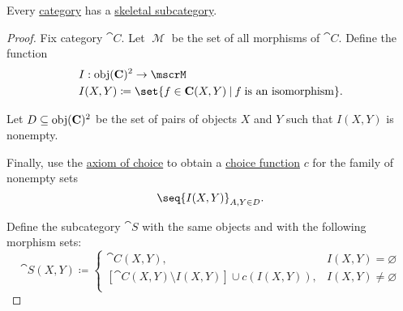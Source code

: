\begin{theorem}\label{thm:skeletal_subcategory_existence}
  Every \hyperref[def:category]{category} has a \hyperref[def:skeletal_category]{skeletal subcategory}.
\end{theorem}
\begin{proof}
  Fix category \( \cat{C} \). Let \( \mscrM \) be the set of all morphisms of \( \cat{C} \). Define the function
  \begin{equation*}
    \begin{aligned}
      &I: \obj(\cat{C})^2 \to \mscrM \\
      &I(X, Y) \coloneqq \set{ f \in \cat{C}(X, Y) \given f \T{is an isomorphism} }.
    \end{aligned}
  \end{equation*}

  Let \( D \subseteq \operatorname{obj}(\operatorname{\mathbf{C}})^2 \) be the set of pairs of objects \( X \) and \( Y \) such that \( I(X, Y) \) is nonempty.

  Finally, use the \hyperref[def:zfc/choice]{axiom of choice} to obtain a \hyperref[def:choice_function]{choice function} \( c \) for the family of nonempty sets
  \begin{equation*}
    \seq{ I(X, Y) }_{A, Y \in D}.
  \end{equation*}

  Define the subcategory \( \cat{S} \) with the same objects and with the following morphism sets:
  \begin{equation*}
    \cat{S}(X, Y) \coloneqq \begin{cases}
      \cat{C}(X, Y),                                     &I(X, Y) = \varnothing \\
      [\cat{C}(X, Y) \setminus I(X, Y)] \cup c(I(X, Y)), &I(X, Y) \neq \varnothing \\
    \end{cases}
  \end{equation*}
\end{proof}
